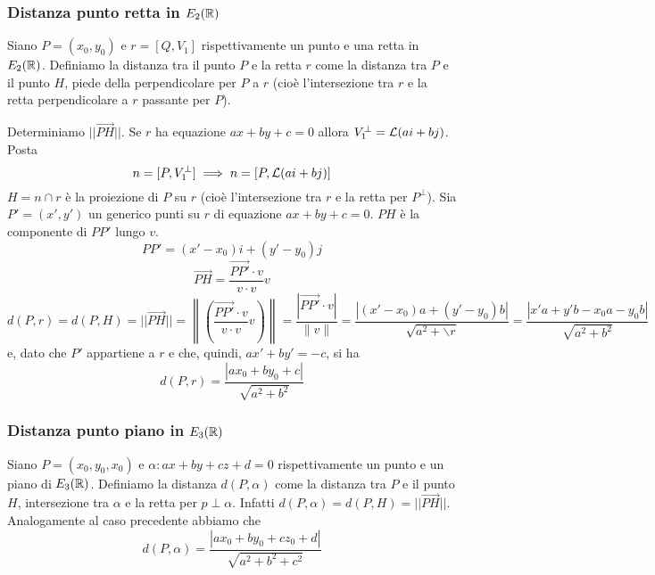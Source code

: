 \subsubsection{Distanza punto retta in \(E_2(\RR )\)}
Siano \(P = (x_0, y_0)\) e \(r = [Q, V_1]\) rispettivamente un punto e una retta in \(E_{2}(\RR)\). Definiamo la distanza tra il punto \(P\) e la retta \(r\) come la distanza tra \(P\) e il punto \(H\), piede della perpendicolare per \(P\) a \(r\) (cioè l'intersezione tra \(r\) e la retta perpendicolare a \(r\) passante per \(P\)). 
\begin{center}
\end{center}
Determiniamo \(||\vec{{PH}}||\). Se \(r\) ha equazione \(ax + by +c = 0\) allora \(V_1^{\perp} = \mathcal{L}(a i + b j)  \). Posta \[n = [P, V_1^{\perp}] \implies n = [P, \mathcal{L}(a i + bj) ]\]
\(H = n \cap r \) è la proiezione di \(P\) su \(r\) (cioè l'intersezione tra \(r\) e la retta per \(P^{\perp} \)). Sia \(P' = (x', y')\) un generico punti su \(r\) di equazione \(ax + by + c = 0\). \(PH\) è la componente di \(PP'\) lungo \(v\). \[PP' = (x'-x_0) i + (y' - y_0)j\]\[
    \vec{{PH}} = \frac{\vec{PP'} \cdot v}{ v \cdot v } v
\] \[
d(P,r) = d (P, H) = || \vec{{PH}} || = \left\| \left( \frac{\vec{{PP'}} \cdot v}{v \cdot v} v \right)  \right\| = \frac{|\vec{PP'} \cdot v| }{\|v\|} = \frac{|(x'-x_0) a + (y' - y_0) b| }{\sqrt{a^2 + \backslash r} } = \frac{|x'a + y'b - x_0a - y_0b| }{\sqrt{a^2 + b ^2} }
\] e, dato che \(P'\) appartiene a \(r\) e che, quindi, \(ax' + by' = -c\), si ha \[
d(P, r) = \frac{|ax_0 + by_0 + c|}{\sqrt{a^{2} + b^{2} }}
\] 
\subsubsection{Distanza punto piano in \(E_3(\RR )\)}
Siano \(P = (x_0, y_0, x_0)\) e \(\alpha : ax + by + cz + d = 0\) rispettivamente un punto e un piano di \(E_{3}(\RR)\). Definiamo la distanza \(d(P, \alpha)\) come la distanza tra \(P\) e il punto \(H\), intersezione tra \(\alpha\) e la retta per \(p \perp \alpha \). Infatti \(d(P, \alpha )= d (P, H) = ||\vec{{PH}}||\). Analogamente al caso precedente abbiamo che \[
    d(P, \alpha ) = \frac{|ax_0 + by_0 + cz_0 + d|}{\sqrt{a^{2} + b^{2} + c^{2} }}
\]

